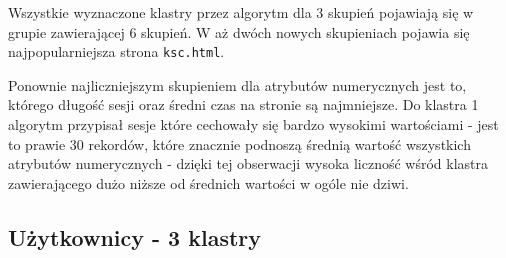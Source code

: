 \documentclass{classrep}
\begin{document}
    Wszystkie wyznaczone klastry przez algorytm dla 3 skupień pojawiają się w grupie zawierającej 6 skupień. W aż dwóch nowych skupieniach pojawia się najpopularniejsza strona \verb|ksc.html|. 
    
    Ponownie najliczniejszym skupieniem dla atrybutów numerycznych jest to, którego długość sesji oraz średni czas na stronie są najmniejsze. Do klastra 1 algorytm przypisał sesje które cechowały się bardzo wysokimi wartościami - jest to prawie 30 rekordów, które znacznie podnoszą średnią wartość wszystkich atrybutów numerycznych - dzięki tej obserwacji wysoka liczność wśród klastra zawierającego dużo niższe od średnich wartości w ogóle nie dziwi. 

    \subsection{Użytkownicy - 3 klastry}

\end{document}
